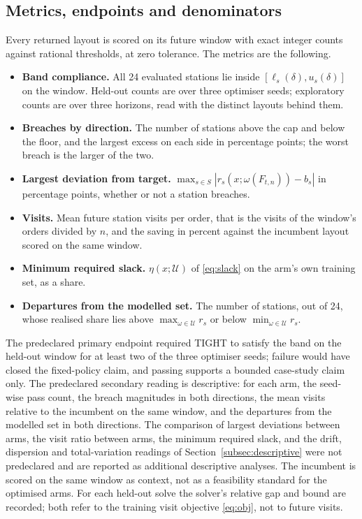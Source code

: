 \subsection{Metrics, endpoints and denominators}\label{subsec:metrics}
Every returned layout is scored on its future window with exact integer counts against rational thresholds, at zero tolerance. The metrics are the following.
\begin{itemize}
\item \textbf{Band compliance.} All 24 evaluated stations lie inside $[\ell_s(\delta),u_s(\delta)]$ on the window. Held-out counts are over three optimiser seeds; exploratory counts are over three horizons, read with the distinct layouts behind them.
\item \textbf{Breaches by direction.} The number of stations above the cap and below the floor, and the largest excess on each side in percentage points; the worst breach is the larger of the two.
\item \textbf{Largest deviation from target.} $\max_{s\in S}|r_s(x;\omega(F_{t,n}))-b_s|$ in percentage points, whether or not a station breaches.
\item \textbf{Visits.} Mean future station visits per order, that is the visits of the window's orders divided by $n$, and the saving in percent against the incumbent layout scored on the same window.
\item \textbf{Minimum required slack.} $\eta(x;\mathcal U)$ of \eqref{eq:slack} on the arm's own training set, as a share.
\item \textbf{Departures from the modelled set.} The number of stations, out of 24, whose realised share lies above $\max_{\omega\in\mathcal U}r_s$ or below $\min_{\omega\in\mathcal U}r_s$.
\end{itemize}

The predeclared primary endpoint required TIGHT to satisfy the band on the held-out window for at least two of the three optimiser seeds; failure would have closed the fixed-policy claim, and passing supports a bounded case-study claim only. The predeclared secondary reading is descriptive: for each arm, the seed-wise pass count, the breach magnitudes in both directions, the mean visits relative to the incumbent on the same window, and the departures from the modelled set in both directions. The comparison of largest deviations between arms, the visit ratio between arms, the minimum required slack, and the drift, dispersion and total-variation readings of Section~\ref{subsec:descriptive} were not predeclared and are reported as additional descriptive analyses. The incumbent is scored on the same window as context, not as a feasibility standard for the optimised arms. For each held-out solve the solver's relative gap and bound are recorded; both refer to the training visit objective \eqref{eq:obj}, not to future visits.

